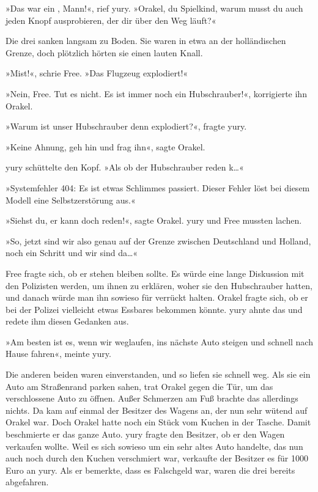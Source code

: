 »Das war ein , Mann!«, rief yury. »Orakel, du Spielkind, warum musst du auch jeden Knopf ausprobieren, der dir über den Weg läuft?«

Die drei sanken langsam zu Boden. Sie waren in etwa an der holländischen Grenze, doch plötzlich hörten sie einen lauten Knall.

»Mist!«, schrie Free. »Das Flugzeug explodiert!«

»Nein, Free. Tut es nicht. Es ist immer noch ein Hubschrauber!«, korrigierte ihn Orakel.

»Warum ist unser Hubschrauber denn explodiert?«, fragte yury.

»Keine Ahnung, geh hin und frag ihn«, sagte Orakel.

yury schüttelte den Kopf. »Als ob der Hubschrauber reden k…«

»Systemfehler 404: Es ist etwas Schlimmes passiert. Dieser Fehler löst bei diesem Modell eine Selbstzerstörung aus.«

»Siehst du, er kann doch reden!«, sagte Orakel. yury und Free mussten lachen.

»So, jetzt sind wir also genau auf der Grenze zwischen Deutschland und Holland, noch ein Schritt und wir sind da…«


Free fragte sich, ob er stehen bleiben sollte. Es würde eine lange Diskussion mit den Polizisten werden, um ihnen zu erklären, woher sie den Hubschrauber hatten, und danach würde man ihn sowieso für verrückt halten. Orakel fragte sich, ob er bei der Polizei vielleicht etwas Essbares bekommen könnte. yury ahnte das und redete ihm diesen Gedanken aus.

»Am besten ist es, wenn wir weglaufen, ins nächste Auto steigen und schnell nach Hause fahren«, meinte yury.

Die anderen beiden waren einverstanden, und so liefen sie schnell weg. Als sie ein Auto am Straßenrand parken sahen, trat Orakel gegen die Tür, um das verschlossene Auto zu öffnen. Außer Schmerzen am Fuß brachte das allerdings nichts. Da kam auf einmal der Besitzer des Wagens an, der nun sehr wütend auf Orakel war. Doch Orakel hatte noch ein Stück vom Kuchen in der Tasche. Damit beschmierte er das ganze Auto. yury fragte den Besitzer, ob er den Wagen verkaufen wollte. Weil es sich sowieso um ein sehr altes Auto handelte, das nun auch noch durch den Kuchen verschmiert war, verkaufte der Besitzer es für 1000 Euro an yury. Als er bemerkte, dass es Falschgeld war, waren die drei bereits abgefahren.

